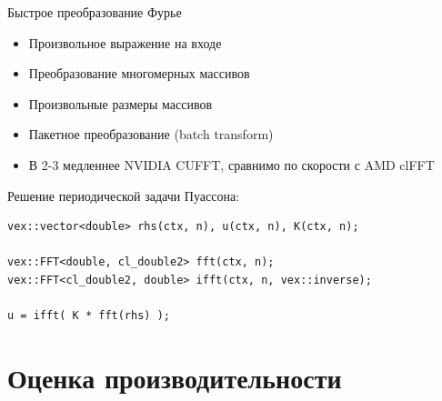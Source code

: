 \documentclass[@BEAMER_OPTIONS@]{beamer}
\newcommand{\singledevice}{}
\begin{document}
\begin{frame}[fragile]{Быстрое преобразование Фурье \singledevice}
    \begin{itemize}
        \item Произвольное выражение на входе
        \item Преобразование многомерных массивов
        \item Произвольные размеры массивов
        \item Пакетное преобразование (batch transform)
        \item В 2-3 медленнее NVIDIA CUFFT, сравнимо по скорости с AMD clFFT
    \end{itemize}
    \begin{exampleblock}{Решение периодической задачи Пуассона:}
        \begin{lstlisting}
vex::vector<double> rhs(ctx, n), u(ctx, n), K(ctx, n);

vex::FFT<double, cl_double2> fft(ctx, n);
vex::FFT<cl_double2, double> ifft(ctx, n, vex::inverse);

u = ifft( K * fft(rhs) );
        \end{lstlisting}
    \end{exampleblock}
\end{frame}

\section{Оценка производительности}

\begin{frame}
    \sectionpage
\end{frame}
\end{document}
